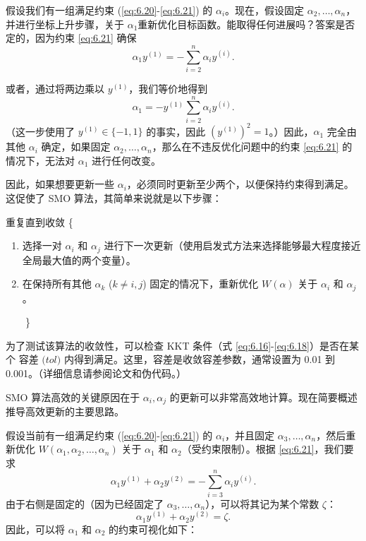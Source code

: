 假设我们有一组满足约束 (\eqref{eq:6.20}-\eqref{eq:6.21}) 的 $\alpha_i$。现在，假设固定 $\alpha_2, \dots, \alpha_n$，并进行坐标上升步骤，关于 $\alpha_1$重新优化目标函数。能取得任何进展吗？答案是否定的，因为约束 \eqref{eq:6.21} 确保
\[
    \alpha_1 y^{(1)} = - \sum_{i=2}^n \alpha_i y^{(i)}.
\]

或者，通过将两边乘以 $y^{(1)}$，我们等价地得到
\[
    \alpha_1 = -y^{(1)} \sum_{i=2}^n \alpha_i y^{(i)}.
\]
（这一步使用了 $y^{(1)} \in \{-1, 1\}$ 的事实，因此 $(y^{(1)})^2 = 1$。）因此，$\alpha_1$ 完全由其他 $\alpha_i$ 确定，如果固定 $\alpha_2, \dots, \alpha_n$，那么在不违反优化问题中的约束 \eqref{eq:6.21} 的情况下，无法对 $\alpha_1$ 进行任何改变。

因此，如果想要更新一些 $\alpha_i$，必须同时更新至少两个，以便保持约束得到满足。这促使了 SMO 算法，其简单来说就是以下步骤：

\begin{samepage}
重复直到收敛 \{
\vspace{-0.5em}
\begin{enumerate}
\setlength{\itemindent}{2em}
    \item 选择一对 $\alpha_i$ 和 $\alpha_j$ 进行下一次更新（使用启发式方法来选择能够最大程度接近全局最大值的两个变量）。
    \item 在保持所有其他 $\alpha_k$ ($k \ne i, j$) 固定的情况下，重新优化 $W(\alpha)$ 关于 $\alpha_i$ 和 $\alpha_j$。
\end{enumerate}
$\quad\quad$\}
\end{samepage}

为了测试该算法的收敛性，可以检查 KKT 条件（式 \eqref{eq:6.16}-\eqref{eq:6.18}）是否在某个 $\textit{容差 (tol)}$ 内得到满足。这里，容差是收敛容差参数，通常设置为 0.01 到 0.001。（详细信息请参阅论文和伪代码。）

SMO 算法高效的关键原因在于 $\alpha_i, \alpha_j$ 的更新可以非常高效地计算。现在简要概述推导高效更新的主要思路。

假设当前有一组满足约束 (\eqref{eq:6.20}-\eqref{eq:6.21}) 的 $\alpha_i$，并且固定 $\alpha_3, \dots, \alpha_n$，然后重新优化 $W(\alpha_1, \alpha_2, \dots, \alpha_n)$ 关于 $\alpha_1$ 和 $\alpha_2$（受约束限制）。根据 \eqref{eq:6.21}，我们要求
\[
    \alpha_1 y^{(1)} + \alpha_2 y^{(2)} = - \sum_{i=3}^n \alpha_i y^{(i)}.
\]
由于右侧是固定的（因为已经固定了 $\alpha_3, \dots, \alpha_n$），可以将其记为某个常数 $\zeta$：
\begin{equation}
    \alpha_1 y^{(1)} + \alpha_2 y^{(2)} = \zeta. \label{eq:6.22}
\end{equation}
因此，可以将 $\alpha_1$ 和 $\alpha_2$ 的约束可视化如下：

